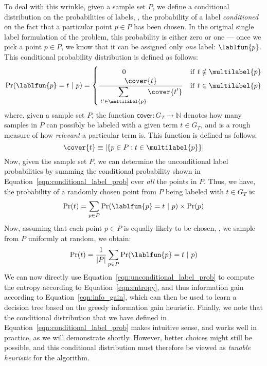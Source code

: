 To deal with this wrinkle, given a sample set $P$, we define a
conditional distribution on the probabilities of labels, \ie, the
probability of a label \emph{conditioned} on the fact that a
particular point $p \in P$ has been chosen. In the original single
label formulation of the problem, this probability is either zero or
one --- once we pick a point $p \in P$, we know that it can be
assigned only \emph{one} label: $\lablfun{p}$. This conditional
probability distribution is defined as follows:
\begin{equation}
\mathrm{Pr}(\lablfun{p} = t\ |\  p) =
\begin{cases}
\displaystyle\ \quad\qquad 0 & \mathrm{if}\ t \notin \multilabel{p}\\
\frac{\strut\displaystyle\cover{t}}{\strut\displaystyle\sum_{t' \in \multilabel{p}}\cover{t'}} & \mathrm{if}\
  t \in \multilabel{p}
\end{cases}
\label{eqn:conditional_label_prob}
\end{equation}
where, given a sample set $P$, the function $\mathsf{cover} : G_T
\rightarrow \mathbb{N}$ denotes how many samples in $P$ can possibly
be labeled with a given term $t \in G_T$, and is a rough measure of
how \emph{relevant} a particular term is. This function is defined as
follows:
\begin{equation}
\cover{t} \equiv \left|\left\{p \in P : t \in \multilabel{p}\right\}\right|
\end{equation}
Now, given the sample set $P$, we can determine the unconditional
label probabilities by summing the conditional probability shown in
Equation~\ref{eqn:conditional_label_prob} over \emph{all} the points
in $P$. Thus, we have, the probability of a randomly chosen point from
$P$ being labeled with $t \in G_T$ is:
\begin{equation*}
\mathrm{Pr}(t) = \sum_{p \in P}\mathrm{Pr}(\lablfun{p} = t\ |\ p) \times \mathrm{Pr}(p)
\end{equation*}
Now, assuming that each point $p \in P$ is equally likely to be
chosen, \ie, we sample from $P$ uniformly at random, we obtain:
\begin{equation}
\mathrm{Pr}(t) = \frac{1}{|P|}\sum_{p \in P}\mathrm{Pr}(\lablfun{p} = t\ |\ p)
\label{eqn:unconditional_label_prob}
\end{equation}
We can now directly use Equation~\ref{eqn:unconditional_label_prob} to
compute the entropy according to Equation~\ref{eqn:entropy}, and thus
information gain according to Equation~\ref{eqn:info_gain}, which can then
be used to learn a decision tree based on the greedy information gain
heuristic. Finally, we note that the conditional distribution
that we have defined in Equation~\ref{eqn:conditional_label_prob}
makes intuitive sense, and works well in practice, as we will
demonstrate shortly. However, better choices might still be possible,
and this conditional distribution must therefore be viewed as
\emph{tunable heuristic} for the algorithm.

